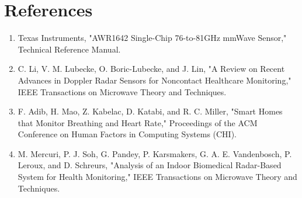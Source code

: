 \documentclass[12pt]{article}
\begin{document}
\section{References}

\begin{enumerate}
    \item Texas Instruments, "AWR1642 Single-Chip 76-to-81GHz mmWave Sensor," Technical Reference Manual.
    
    \item C. Li, V. M. Lubecke, O. Boric-Lubecke, and J. Lin, "A Review on Recent Advances in Doppler Radar Sensors for Noncontact Healthcare Monitoring," IEEE Transactions on Microwave Theory and Techniques.
    
    \item F. Adib, H. Mao, Z. Kabelac, D. Katabi, and R. C. Miller, "Smart Homes that Monitor Breathing and Heart Rate," Proceedings of the ACM Conference on Human Factors in Computing Systems (CHI).
    
    \item M. Mercuri, P. J. Soh, G. Pandey, P. Karsmakers, G. A. E. Vandenbosch, P. Leroux, and D. Schreurs, "Analysis of an Indoor Biomedical Radar-Based System for Health Monitoring," IEEE Transactions on Microwave Theory and Techniques.
\end{enumerate}
\end{document}
